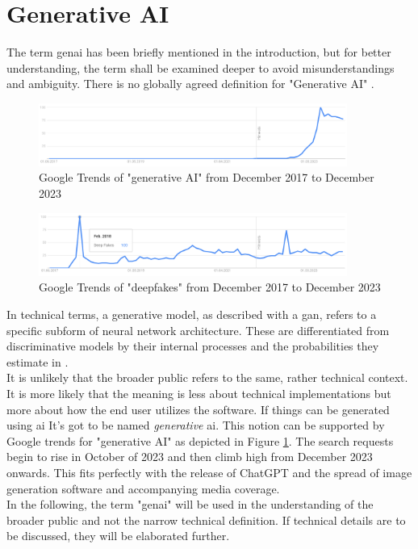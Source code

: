 \documentclass[
  a4paper,  %
  twoside,  %
  bibliography=totoc,
  headsepline,
  cleardoublepage=empty,
  parskip=half,
  draft=false
]{scrbook}
\begin{document}
\section{Generative AI}
\label{sec:genai}
The term \gls{genai} has been briefly mentioned in the introduction, but for better understanding, the term shall be examined deeper to avoid misunderstandings and ambiguity. There is no globally agreed definition for "Generative AI" \cite{garcia-penalvoWhatWeMean2023}.
\begin{figure}[h]
  \centering
  \includegraphics[width=0.9\textwidth]{./graphics/images/gtrends_genAI_1712-2312.png}
  \caption{Google Trends of "generative AI" from December 2017 to December 2023 \cite{googletrendsGoogleTrendsQuery}}
  \label{fig:gtrend-genai}
\end{figure}
\begin{figure}[h]
  \centering
  \includegraphics[width=0.9\textwidth]{./graphics/images/gtrends_deepfake_1712-2312.png}
  \caption{Google Trends of "deepfakes" from December 2017 to December 2023 \cite{googletrendsGoogleTrendsQuerya}}
  \label{fig:gtrend-deepfakes}
\end{figure}
In technical terms, a generative model, as described with a \gls{gan}, refers to a specific subform of neural network architecture. These are differentiated from discriminative models by their internal processes and the probabilities they estimate \cite{garcia-penalvoWhatWeMean2023} in \cite{gmComprehensiveSurveyAnalysis2020}. \\
It is unlikely that the broader public refers to the same, rather technical context. It is more likely that the meaning is less about technical implementations but more about how the end user utilizes the software. If things can be generated using \gls{ai} It's got to be named \textit{generative} \gls{ai}. This notion can be supported by Google trends for "generative AI" as depicted in Figure \ref{fig:gtrend-genai}. The search requests begin to rise in October of 2023 and then climb high from December 2023 onwards. This fits perfectly with the release of ChatGPT and the spread of image generation software and accompanying media coverage. \\
In the following, the term "\gls{genai}" will be used in the understanding of the broader public and not the narrow technical definition. If technical details are to be discussed, they will be elaborated further. 
\end{document}
